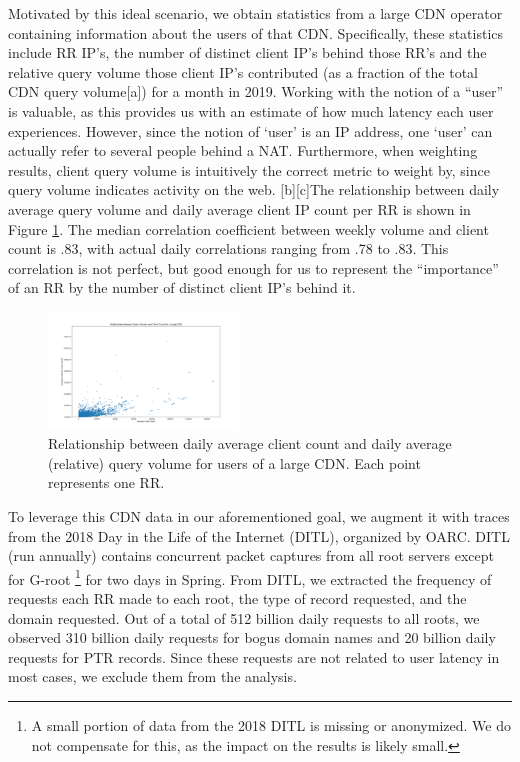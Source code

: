 \documentclass[sigconf,nonacm,10pt]{acmart}
\begin{document}
\label{sec:rr_global_look_data} Motivated by this ideal scenario, we
obtain statistics from a large CDN operator containing information about
the users of that CDN. Specifically, these statistics include RR IP's,
the number of distinct client IP's behind those RR's and the relative
query volume those client IP's contributed (as a fraction of the total
CDN query volume{[}a{]}) for a month in 2019. Working with the notion of
a ``user'' is valuable, as this provides us with an estimate of how much
latency each user experiences. However, since the notion of `user' is an
IP address, one `user' can actually refer to several people behind a
NAT. Furthermore, when weighting results, client query volume is
intuitively the correct metric to weight by, since query volume
indicates activity on the web. {[}b{]}{[}c{]}The relationship between
daily average query volume and daily average client IP count per RR is
shown in Figure \ref{fig:query_client_relationship}. The median
correlation coefficient between weekly volume and client count is .83,
with actual daily correlations ranging from .78 to .83. This correlation
is not perfect, but good enough for us to represent the ``importance''
of an RR by the number of distinct client IP's behind it.

\begin{figure}
    \centering
    \includegraphics[width=0.45\textwidth]{figures/query_client_relationship.png}
    \caption{Relationship between daily average client count and daily average (relative) query volume for users of a large CDN. Each point represents one RR.}
    \label{fig:query_client_relationship}
\end{figure}

To leverage this CDN data in our aforementioned goal, we augment it with
traces from the 2018 Day in the Life of the Internet (DITL), organized
by OARC. DITL (run annually) contains concurrent packet captures from
all root servers except for G-root
\footnote{ A small portion of data from the 2018 DITL is missing or anonymized. We do not compensate for this, as the impact on the results is likely small. }
for two days in Spring. From DITL, we extracted the frequency of
requests each RR made to each root, the type of record requested, and
the domain requested. \break
Out of a total of 512 billion daily requests to all roots, we observed
310 billion daily requests for bogus domain names and 20 billion daily
requests for PTR records. Since these requests are not related to user
latency in most cases, we exclude them from the analysis.
\end{document}
